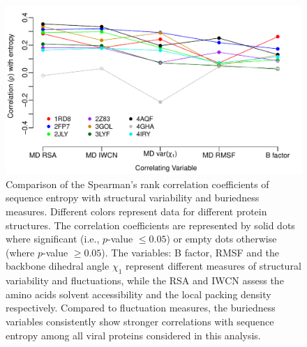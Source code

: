 \documentclass[12pt]{article}
\begin{document}
            \begin{figure}[t]
            \begin{center}
                \includegraphics[height=0.35\textheight]{cor_entropy_all.pdf}
            \end{center}
            \caption{
                     Comparison of the Spearman's rank correlation coefficients of sequence entropy with structural variability and buriedness measures. Different colors represent data for different protein structures. The correlation coefficients are represented by solid dots where significant (i.e., $p$-value $\leq0.05$) or empty dots otherwise (where $p$-value $\geq0.05$). The variables: B factor, RMSF and the backbone dihedral angle $\chi_1$ represent different measures of structural variability and fluctuations, while the RSA and IWCN assess the amino acids solvent accessibility and the local packing density respectively. Compared to fluctuation measures, the buriedness variables consistently show stronger correlations with sequence entropy among all viral proteins considered in this analysis.
                     }
            \label{fig:cor_entropy_all}
            \end{figure}
\end{document}
